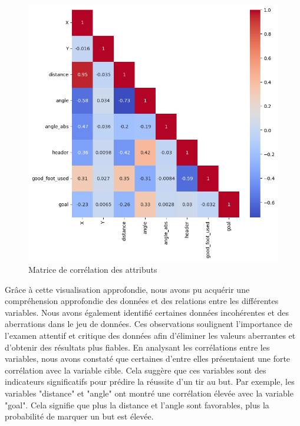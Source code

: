 \documentclass[12pt]{article}
\begin{document}
\begin{figure}
    \centering
    \includegraphics[width=\textwidth]{img/correlation_matrix.png}
    \caption{Matrice de corrélation des attributs}
    \label{fig:correlation_matrix}
\end{figure}
\newpage
Grâce à cette visualisation approfondie, nous avons pu acquérir une compréhension approfondie des données et des relations entre les différentes variables.
Nous avons également identifié certaines données incohérentes et des aberrations dans le jeu de données.
Ces observations soulignent l'importance de l'examen attentif et critique des données afin d'éliminer les valeurs aberrantes et d'obtenir des résultats plus fiables.
\newline\newline
En analysant les corrélations entre les variables, nous avons constaté que certaines d'entre elles présentaient une forte corrélation avec la variable cible.
Cela suggère que ces variables sont des indicateurs significatifs pour prédire la réussite d'un tir au but.
Par exemple, les variables "distance" et "angle" ont montré une corrélation élevée avec la variable "goal".
Cela signifie que plus la distance et l'angle sont favorables, plus la probabilité de marquer un but est élevée.
\newline\newline
\end{document}

